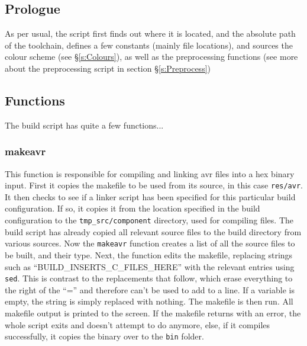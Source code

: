 \documentclass[a4paper, oneside, 11pt, titlepage, onecolumn, openright]{report}
\begin{document}
\subsection{Prologue}
			\label{ss:buildPrologue}
			As per usual, the script first finds out where it is located, and the absolute path of the toolchain, defines a few constants (mainly file locations), and sources the colour scheme (see \S\ref{s:Colours}), as well as the preprocessing functions (see more about the preprocessing script in section \S\ref{s:Preprocess})
			
\subsection{Functions}
			\label{ss:buildFunctions}
			The build script has quite a few functions...
			
\subsubsection{makeavr}
			\label{sss:buildMakeavr}
			This function is responsible for compiling and linking avr files into a hex binary input.\newline
			First it copies the makefile to be used from its source, in this case \texttt{res/avr}.\newline
			It then checks to see if a linker script has been specified for this particular build configuration. If so, it copies it from the location specified in the build configuration to the \texttt{tmp\_src/component} directory, used for compiling files.\newline \newline
			The build script has already copied all relevant source files to the build directory from various sources. Now the \texttt{makeavr} function creates a list of all the source files to be built, and their type.\newline
			Next, the function edits the makefile, replacing strings such as ``BUILD\_INSERTS\_C\_FILES\_HERE'' with the relevant entries using \texttt{sed}. This is contrast to the replacements that follow, which erase everything to the right of the ``='' and therefore can't be used to add to a line. If a variable is empty, the string is simply replaced with nothing.\newline \newline
			The makefile is then run. All makefile output is printed to the screen. If the makefile returns with an error, the whole script exits and doesn't attempt to do anymore, else, if it compiles successfully, it copies the binary over to the \texttt{bin} folder.
			
\end{document}
